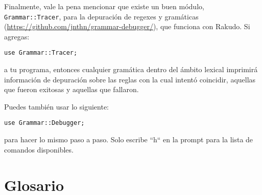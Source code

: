 Finalmente, vale la pena mencionar que existe un buen módulo, \verb|Grammar::Tracer|, 
para la depuración de regexes y gramáticas (\url{https://github.com/jnthn/grammar-debugger/}), 
que funciona con Rakudo. Si agregas:

\begin{lstlisting}
use Grammar::Tracer;
\end{lstlisting}

a tu programa, entonces cualquier gramática dentro del ámbito lexical
imprimirá información de depuración sobre las reglas con la cual
intentó coincidir, aquellas que fueron exitosas y aquellas que 
fallaron.

Puedes también usar lo siguiente:

\begin{lstlisting}
use Grammar::Debugger;
\end{lstlisting}

para hacer lo mismo paso a paso. Solo escribe ``h`` en la 
prompt para la lista de comandos disponibles.


\section{Glosario}

